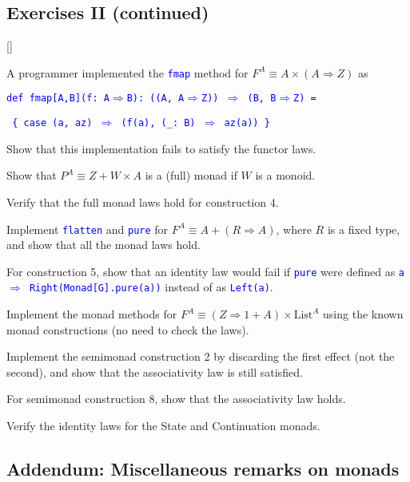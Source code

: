 \subsection{Exercises II (continued)}

[]\addtocounter{enumi}{7}\vspace*{-0.5cm}

A programmer implemented the \texttt{\textcolor{blue}{\footnotesize{}fmap}}
method for {\footnotesize{}$F^{A}\equiv A\times\left(A\Rightarrow Z\right)$
}as

\texttt{\textcolor{blue}{\footnotesize{}def fmap{[}A,B{]}(f: A$\Rightarrow$B): ((A,
A$\Rightarrow$Z)) $\Rightarrow$ (B, B$\Rightarrow$Z) =}}{\footnotesize\par}

\texttt{\textcolor{blue}{\footnotesize{}  \{ case (a, az) $\Rightarrow$
(f(a), (\_: B) $\Rightarrow$ az(a)) \}}}{\footnotesize\par}

Show that this implementation fails to satisfy the functor laws.

Show that $P^{A}\equiv Z+W\times A$ is a (full) monad if $W$ is
a monoid.

Verify that the full monad laws hold for construction 4.

Implement \texttt{\textcolor{blue}{\footnotesize{}flatten}} and \texttt{\textcolor{blue}{\footnotesize{}pure}}
for $F^{A}\equiv A+\left(R\Rightarrow A\right)$, where $R$ is a
fixed type, and show that all the monad laws hold.

For construction 5, show that an identity law would fail if \texttt{\textcolor{blue}{\footnotesize{}pure}}
were defined as \texttt{\textcolor{blue}{\footnotesize{}a $\Rightarrow$
Right(Monad{[}G{]}.pure(a))}} instead of as \texttt{\textcolor{blue}{\footnotesize{}Left(a)}}.

Implement the monad methods for $F^{A}\equiv\left(Z\Rightarrow1+A\right)\times\text{List}^{A}$
using the known monad constructions (no need to check the laws).

Implement the semimonad construction 2 by discarding the first effect
(not the second), and show that the associativity law is still satisfied.

For semimonad construction 8, show that the associativity law holds.

Verify the identity laws for the State and Continuation monads.


\subsection{Addendum: Miscellaneous remarks on monads}

